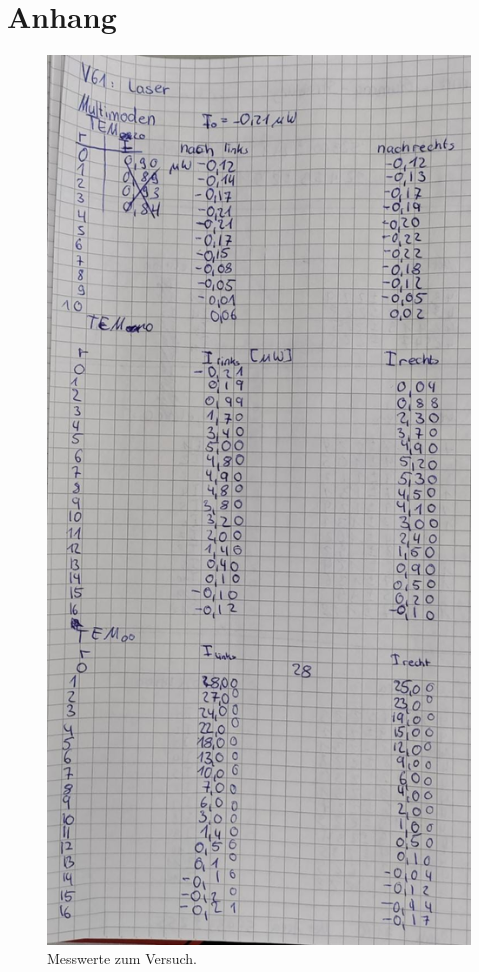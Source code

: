 \section{Anhang}\label{sec:Anhang}
\begin{figure}[h]
   \centering
    \includegraphics[scale=0.4]{Abbildungen/Kladde1.jpg}
   \caption{Messwerte zum Versuch.}
\end{figure}
